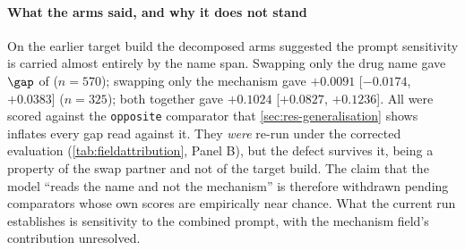\paragraph{What the arms said, and why it does not stand} On the earlier target
build the decomposed arms suggested the prompt sensitivity is carried almost
entirely by the name span. Swapping only the drug name gave $\gap$ of
 ($n = 570$); swapping only the mechanism gave
$+0.0091$ [$-0.0174$, $+0.0383$] ($n = 325$); both together gave $+0.1024$
[$+0.0827$, $+0.1236$]. All were scored against the \texttt{opposite}
comparator that \cref{sec:res-generalisation} shows inflates every gap read
against it. They \emph{were} re-run under the corrected evaluation
(\cref{tab:fieldattribution}, Panel B), but the defect survives it, being a
property of the swap partner and not of the target build. The claim that the
model ``reads the name and not the mechanism'' is therefore withdrawn pending
comparators whose own scores are empirically near chance. What the current run
establishes is sensitivity to the combined prompt, with the mechanism field's
contribution unresolved.

